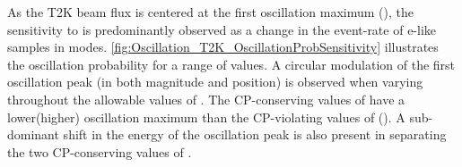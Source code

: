 As the T2K beam flux is centered at the first oscillation maximum (), the sensitivity to \dcp is predominantly observed as a change in the event-rate of e-like samples in \quickmath{\nu/\bar{\nu}} modes. \autoref{fig:Oscillation_T2K_OscillationProbSensitivity} illustrates the  oscillation probability for a range of \dcp values. %
A circular modulation of the first oscillation peak (in both magnitude and position) is observed when varying throughout the allowable values of \dcp. The CP-conserving values of  have a lower(higher) oscillation maximum than the CP-violating values of (). A sub-dominant shift in the energy of the oscillation peak is also present in separating the two CP-conserving values of \dcp.

